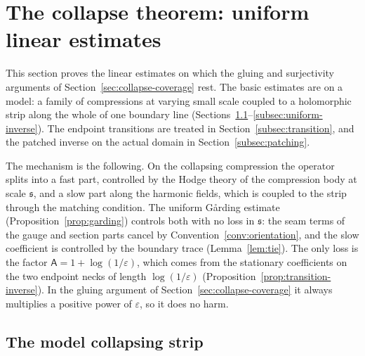 \documentclass[11pt]{amsart}
\theoremstyle{definition}
\theoremstyle{remark}
\theoremstyle{plain}
\numberwithin{equation}{section}
\newcommand{\eps}{\varepsilon}
\begin{document}
\section{The collapse theorem: uniform linear estimates}\label{sec:collapse-linear}

This section proves the linear estimates on which the gluing and surjectivity
arguments of Section~\ref{sec:collapse-coverage} rest. The basic
estimates are on a model: a family of compressions at varying small scale
coupled to a holomorphic strip along the whole of one boundary line
(Sections~\ref{subsec:model}--\ref{subsec:uniform-inverse}). The endpoint
transitions are treated in Section~\ref{subsec:transition}, and the
patched inverse on the actual domain in Section~\ref{subsec:patching}.

The mechanism is the following. On the collapsing compression the operator splits into a
fast part, controlled by the Hodge theory of the compression body at scale $\mathfrak s$, and
a slow part along the harmonic fields, which is coupled to the strip through the matching
condition. The uniform Gårding estimate (Proposition~\ref{prop:garding}) controls both with
no loss in $\mathfrak s$: the seam terms of the gauge and section parts cancel by
Convention~\ref{conv:orientation}, and the slow coefficient is controlled by the boundary
trace (Lemma~\ref{lem:tie}). The
only loss is the factor $\mathsf A=1+\log(1/\eps)$, which comes from the stationary
coefficients on the two endpoint necks of length $\log(1/\eps)$
(Proposition~\ref{prop:transition-inverse}). In the gluing argument of
Section~\ref{sec:collapse-coverage} it always multiplies a positive power of $\eps$, so it
does no harm.

\subsection{The model collapsing strip}\label{subsec:model}
\end{document}
